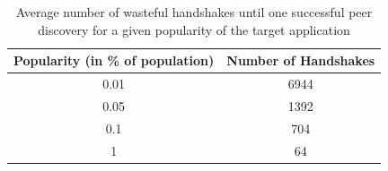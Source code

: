 
\begin{table} [!hbt]
\caption{Average number of wasteful handshakes until one successful peer discovery for a given popularity of the target application}
\label{tab:discv4Overhead}
\renewcommand{\arraystretch}{1.5}
\renewcommand{\tabcolsep}{0.5em}
\centering
\scriptsize{
\begin{tabular} {c|c}
\textbf{Popularity (in \% of population)} & \textbf{Number of Handshakes} \\
\hline
0.01 & 6944 \\ 
\hline
0.05 & 1392 \\
\hline
0.1 & 704 \\
\hline
1 & 64 \\
\bottomrule
\end{tabular}
}
\vspace{-0.2in}
\end{table}


